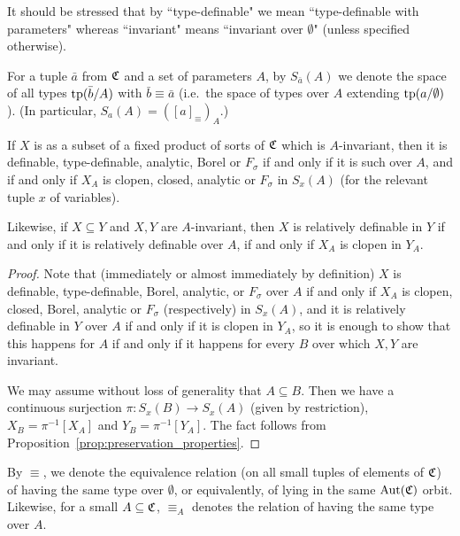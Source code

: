 	It should be stressed that by ``type-definable" we mean ``type-definable with parameters" whereas ``invariant" means ``invariant over $\emptyset$" (unless specified otherwise).
	
	
	\begin{dfn}
		For a tuple $\bar a$ from ${\mathfrak C}$ and a set of parameters $A$, by $S_{\bar a}(A)$ we denote the space of all types $\operatorname{{tp}}(\bar b/A)$ with $\bar b \equiv \bar a$ (i.e.\ the space of types over $A$ extending $\operatorname{{tp}}(a/\emptyset)$). (In particular, $S_a(A)=([a]_{\equiv})_A$.)\xqed{\lozenge}
	\end{dfn}
	
	
	\begin{fct}
		\label{fct:dtafb}
		If $X$ is as a subset of a fixed product of sorts of ${\mathfrak C}$ which is $A$-invariant, then it is definable, type-definable, analytic, Borel or $F_\sigma$ if and only if it is such over $A$, and if and only if $X_A$ is clopen, closed, analytic or $F_\sigma$ in $S_x(A)$ (for the relevant tuple $x$ of variables).
		
		Likewise, if $X\subseteq Y$ and $X,Y$ are $A$-invariant, then $X$ is relatively definable in $Y$ if and only if it is relatively definable over $A$, if and only if $X_A$ is clopen in $Y_A$.
	\end{fct}
	\begin{proof}
		Note that (immediately or almost immediately by definition) $X$ is definable, type-definable, Borel, analytic, or $F_\sigma$ over $A$ if and only if $X_A$ is clopen, closed, Borel, analytic or $F_\sigma$ (respectively) in $S_x(A)$, and it is relatively definable in $Y$ over $A$ if and only if it is clopen in $Y_A$, so it is enough to show that this happens for $A$ if and only if it happens for every $B$ over which $X,Y$ are invariant.
		
		We may assume without loss of generality that $A\subseteq B$. Then we have a continuous surjection $\pi \colon S_x(B)\to S_x(A)$ (given by restriction), $X_B=\pi^{-1}[X_A]$ and $Y_B=\pi^{-1}[Y_A]$. The fact follows from Proposition~\ref{prop:preservation_properties}.
	\end{proof}
	
	\begin{dfn}
		\index{equiv@$\equiv$}
		By $\equiv$, we denote the equivalence relation (on all small tuples of elements of ${\mathfrak C}$) of having the same type over $\emptyset$, or equivalently, of lying in the same $\operatorname{{Aut}}({\mathfrak C})$ orbit. Likewise, for a small $A\subseteq {\mathfrak C}$, $\equiv_A$ denotes the relation of having the same type over $A$.\xqed{\lozenge}
	\end{dfn}
	
